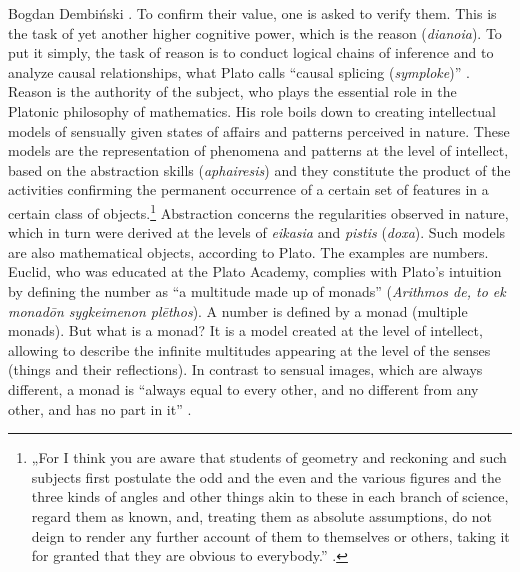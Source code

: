 \begin{artengenv}{Bogdan Dembiński}
\parencite[\textit{Meno}, 85c.98a.97c]{plato_platonis_1955}.
To confirm their value, one is asked to verify them. This is
the task of yet another higher cognitive power, which is the reason (\textit{dianoia}). To put it
simply, the task of reason is to conduct logical chains of inference and to analyze causal relationships, what Plato
calls ``causal splicing (\textit{symploke})''
\parencite[\textit{Meno}, 97e-98a]{plato_platonis_1955}.
 Reason is the
authority of the subject, who plays the essential role in the Platonic philosophy of mathematics. His role boils down
to creating intellectual models of sensually given states of affairs and patterns perceived in nature. These models are
the representation of phenomena and patterns at the level of intellect, based on the abstraction skills
(\textit{aphairesis}) and they constitute the product of the activities confirming the permanent occurrence of a
certain set of features in a certain class of objects.\footnote{„For I think you are aware that students of geometry
and reckoning and such subjects first postulate the odd and the even and the various figures and the three kinds of
angles and other things akin to these in each branch of science, regard them as known, and, treating them as absolute
assumptions, do not deign to render any further account of them to themselves or others, taking it for granted that
they are obvious to everybody.''
\parencite[\textit{Republic}, 510c]{plato_platonis_1955}.
} Abstraction concerns the
regularities observed in nature, which in turn were derived at the levels of \textit{eikasia} and \textit{pistis}
(\textit{doxa}). Such models are also mathematical %
objects, according to Plato. The examples are numbers. Euclid, who was educated at the Plato Academy, complies with
Plato’s intuition by defining the number as ``a multitude made up of monads'' (\textit{Arithmos de, to ek monad\=on
sygkeimenon pl\=ethos}). A number is defined by a monad (multiple monads). But what is a monad? It is a model created
at the level of intellect, allowing to describe the infinite multitudes appearing at the level of the senses (things
and their reflections). In contrast to sensual images, which are always different, a monad is ``always equal to every
other, and no different from any other, and has no part in it''
\parencite[\textit{Republic}, 526a]{plato_platonis_1955}.

\end{artengenv}

